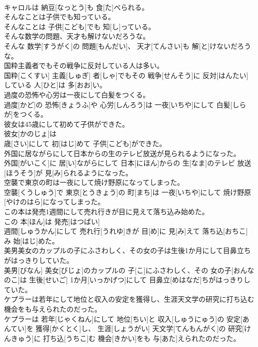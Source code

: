 \documentclass[8pt]{extreport}
\begin{document}
\begin{CJK}{UTF8}{min}
\\	キャロルは 納豆[なっとう]も 食[た]べられる。
\\	そんなことは子供でも知っている。	
\\	そんなことは 子供[こども]でも 知[し]っている。
\\	そんな数学の問題、天才も解けないだろうな。	
\\	そんな 数学[すうがく]の 問題[もんだい]、 天才[てんさい]も 解[と]けないだろうな。
\\	国粋主義者でもその戦争に反対している人は多い。	
\\	国粋[こくすい] 主義[しゅぎ] 者[しゃ]でもその 戦争[せんそう]に 反対[はんたい]している 人[ひと]は 多[おお]い。
\\	過度の恐怖や心労は一夜にして白髪をつくる。	
\\	過度[かど]の 恐怖[きょうふ]や 心労[しんろう]は 一夜[いちや]にして 白髪[しらが]をつくる。
\\	彼女は45歳にして初めて子供ができた。	
\\	彼女[かのじょ]は 
\\	歳[さい]にして 初[はじ]めて 子供[こども]ができた。
\\	外国に居ながらにして日本からの生のテレビ放送が見られるようになった。	
\\	外国[がいこく]に 居[い]ながらにして 日本[にほん]からの 生[なま]のテレビ 放送[ほうそう]が 見[み]られるようになった。
\\	空襲で東京の町は一夜にして焼け野原になってしまった。	
\\	空襲[くうしゅう]で 東京[とうきょう]の 町[まち]は 一夜[いちや]にして 焼け野原[やけのはら]になってしまった。
\\	この本は発売1週間にして売れ行きが目に見えて落ち込み始めた。	
\\	この 本[ほん]は 発売[はつばい] 
\\	週間[しゅうかん]にして 売れ行[うれゆ]きが 目[め]に 見[み]えて 落ち込[おちこ]み 始[はじ]めた。
\\	美男美女のカップルの子にふさわしく、その女の子は生後1か月にして目鼻立ちがはっきりしていた。	
\\	美男[びなん] 美女[びじょ]のカップルの 子[こ]にふさわしく、その 女の子[おんなのこ]は 生後[せいご] 1か月[いっかげつ]にして 目鼻立[めはなだ]ちがはっきりしていた。
\\	ケプラーは若年にして地位と収入の安定を獲得し、生涯天文学の研究に打ち込む機会をも与えられたのだった。	
\\	ケプラーは 若年[じゃくねん]にして 地位[ちい]と 収入[しゅうにゅう]の 安定[あんてい]を 獲得[かくとく]し、 生涯[しょうがい] 天文学[てんもんがく]の 研究[けんきゅう]に 打ち込[うちこ]む 機会[きかい]をも 与[あた]えられたのだった。

\end{CJK}
\end{document}
